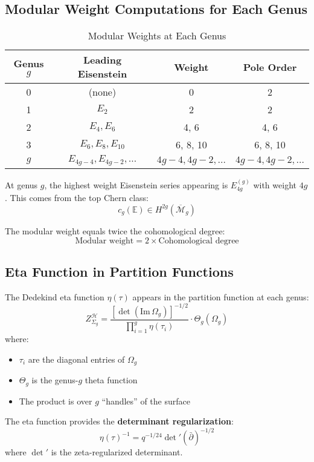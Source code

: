 \subsection{Modular Weight Computations for Each Genus}
\label{subsec:modular-weights-all-genus}

\begin{table}[h]
\centering
\caption{Modular Weights at Each Genus}
\label{tab:modular-weights}
\begin{tabular}{|c|c|c|c|}
\hline
\textbf{Genus $g$} & \textbf{Leading Eisenstein} & \textbf{Weight} & 
\textbf{Pole Order} \\
\hline
0 & (none) & 0 & 2 \\
\hline
1 & $E_2$ & 2 & 2 \\
\hline
2 & $E_4, E_6$ & 4, 6 & 4, 6 \\
\hline
3 & $E_6, E_8, E_{10}$ & 6, 8, 10 & 6, 8, 10 \\
\hline
$g$ & $E_{4g-4}, E_{4g-2}, \ldots$ & $4g-4, 4g-2, \ldots$ & $4g-4, 4g-2, \ldots$ \\
\hline
\end{tabular}
\end{table}

\begin{proposition}\label{prop:modular-weight-formula}
At genus $g$, the highest weight Eisenstein series appearing is $E_{4g}^{(g)}$ 
with weight $4g$. This comes from the top Chern class:
$$c_g(\mathbb{E}) \in H^{2g}(\overline{\mathcal{M}}_g)$$

The modular weight equals twice the cohomological degree:
$$\text{Modular weight} = 2 \times \text{Cohomological degree}$$
\end{proposition}

\subsection{Eta Function in Partition Functions}
\label{subsec:eta-partition-functions}

\begin{theorem}\label{thm:eta-appearance}
The Dedekind eta function $\eta(\tau)$ appears in the partition function at each genus:
\begin{equation}
Z_{\Sigma_g}^{\mathcal{H}} = \frac{[\det(\text{Im}\,\Omega_g)]^{-1/2}}
{\prod_{i=1}^{g} \eta(\tau_i)} \cdot \Theta_g(\Omega_g)
\end{equation}
where:
\begin{itemize}
\item $\tau_i$ are the diagonal entries of $\Omega_g$
\item $\Theta_g$ is the genus-$g$ theta function
\item The product is over $g$ ``handles'' of the surface
\end{itemize}

The eta function provides the \textbf{determinant regularization}:
$$\eta(\tau)^{-1} = q^{-1/24} \det'(\bar{\partial})^{-1/2}$$
where $\det'$ is the zeta-regularized determinant.
\end{theorem}

